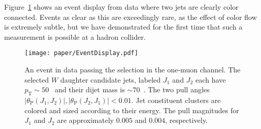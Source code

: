 Figure~\ref{fig:color:eventdisplay} shows an event display from data where two jets are clearly color connected. Events as clear as this are exceedingly rare, as the effect of color flow is extremely subtle, but we have demonstrated for the first time that such a measurement is possible at a hadron collider.


\begin{figure}[htbp]
  \centering
    \texttt{[image: paper/EventDisplay.pdf]}
  \caption{An event in data passing the selection in the one-muon channel.  The selected $W$ daughter candidate jets, labeled $J_1$ and $J_2$ each have $p_\text{T}\sim 50$ \GeV\, and their dijet mass is $\sim 70$ \GeV\,.  The two pull angles $|\theta_\text{P}(J_1,J_2)|,|\theta_\text{P}(J_2,J_1)| < 0.01$.  Jet constituent clusters are colored and sized according to their energy.  The pull magnitudes for $J_1$ and $J_2$ are approximately $0.005$ and $0.004$, respectively.}
  \label{fig:color:eventdisplay}
\end{figure}

		